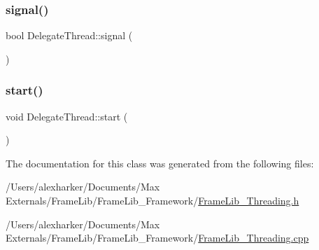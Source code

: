 \subsubsection{\texorpdfstring{signal()}{signal()}}
{\footnotesize\ttfamily bool Delegate\+Thread\+::signal (\begin{DoxyParamCaption}{ }\end{DoxyParamCaption})}

\mbox{\label{class_delegate_thread_a45a890ecb21c6e560ff9e391837453ad}} 
\subsubsection{\texorpdfstring{start()}{start()}}
{\footnotesize\ttfamily void Delegate\+Thread\+::start (\begin{DoxyParamCaption}{ }\end{DoxyParamCaption})\hspace{0.3cm}{\ttfamily [inline]}}



The documentation for this class was generated from the following files\+:\begin{DoxyCompactItemize}
\item 
/\+Users/alexharker/\+Documents/\+Max Externals/\+Frame\+Lib/\+Frame\+Lib\+\_\+\+Framework/\hyperlink{_frame_lib___threading_8h}{Frame\+Lib\+\_\+\+Threading.\+h}\item 
/\+Users/alexharker/\+Documents/\+Max Externals/\+Frame\+Lib/\+Frame\+Lib\+\_\+\+Framework/\hyperlink{_frame_lib___threading_8cpp}{Frame\+Lib\+\_\+\+Threading.\+cpp}\end{DoxyCompactItemize}
